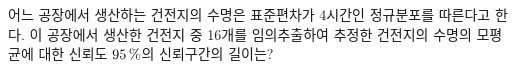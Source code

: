 어느 공장에서 생산하는 건전지의 수명은 표준편차가 4시간인 정규분포를 따른다고 한다. 이 공장에서 생산한 건전지 중 16개를 임의추출하여 추정한 건전지의 수명의 모평균에 대한 신뢰도 $95\mkern3mu \%$의 신뢰구간의 길이는? 
